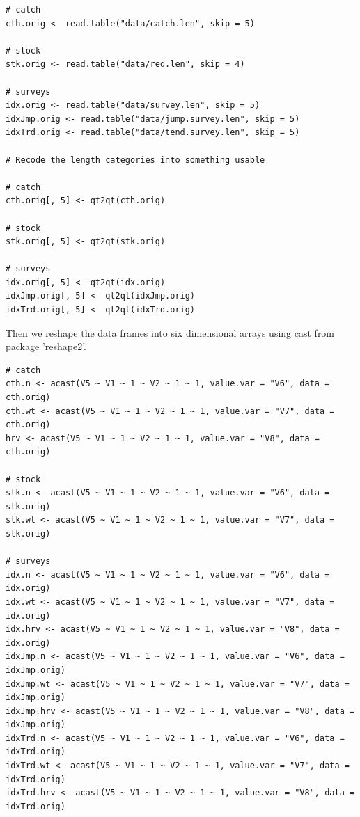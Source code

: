 \documentclass[a4paper,english,10pt]{article}\usepackage[]{graphicx}\usepackage[]{color}
\makeatletter
\newenvironment{kframe}{%
 \def\at@end@of@kframe{}%
 \ifinner\ifhmode%
  \def\at@end@of@kframe{\end{minipage}}%
  \begin{minipage}{\columnwidth}%
 \fi\fi%
 \def\FrameCommand##1{\hskip\@totalleftmargin \hskip-\fboxsep
 \colorbox{shadecolor}{##1}\hskip-\fboxsep
     \hskip-\linewidth \hskip-\@totalleftmargin \hskip\columnwidth}%
 \MakeFramed {\advance\hsize-\width
   \@totalleftmargin\z@ \linewidth\hsize
   \@setminipage}}%
 {\par\unskip\endMakeFramed%
 \at@end@of@kframe}
\newenvironment{knitrout}{}{} %
\makeatother
\begin{document}
\begin{knitrout}
\color{fgcolor}\begin{kframe}
\begin{verbatim}
# catch
cth.orig <- read.table("data/catch.len", skip = 5)

# stock
stk.orig <- read.table("data/red.len", skip = 4)

# surveys
idx.orig <- read.table("data/survey.len", skip = 5)
idxJmp.orig <- read.table("data/jump.survey.len", skip = 5)
idxTrd.orig <- read.table("data/tend.survey.len", skip = 5)

# Recode the length categories into something usable

# catch
cth.orig[, 5] <- qt2qt(cth.orig)

# stock
stk.orig[, 5] <- qt2qt(stk.orig)

# surveys
idx.orig[, 5] <- qt2qt(idx.orig)
idxJmp.orig[, 5] <- qt2qt(idxJmp.orig)
idxTrd.orig[, 5] <- qt2qt(idxTrd.orig)
\end{verbatim}
\end{kframe}
\end{knitrout}


Then we reshape the data frames into six dimensional arrays using cast from package 'reshape2'.

\begin{knitrout}
\color{fgcolor}\begin{kframe}
\begin{verbatim}
# catch
cth.n <- acast(V5 ~ V1 ~ 1 ~ V2 ~ 1 ~ 1, value.var = "V6", data = cth.orig)
cth.wt <- acast(V5 ~ V1 ~ 1 ~ V2 ~ 1 ~ 1, value.var = "V7", data = cth.orig)
hrv <- acast(V5 ~ V1 ~ 1 ~ V2 ~ 1 ~ 1, value.var = "V8", data = cth.orig)

# stock
stk.n <- acast(V5 ~ V1 ~ 1 ~ V2 ~ 1 ~ 1, value.var = "V6", data = stk.orig)
stk.wt <- acast(V5 ~ V1 ~ 1 ~ V2 ~ 1 ~ 1, value.var = "V7", data = stk.orig)

# surveys
idx.n <- acast(V5 ~ V1 ~ 1 ~ V2 ~ 1 ~ 1, value.var = "V6", data = idx.orig)
idx.wt <- acast(V5 ~ V1 ~ 1 ~ V2 ~ 1 ~ 1, value.var = "V7", data = idx.orig)
idx.hrv <- acast(V5 ~ V1 ~ 1 ~ V2 ~ 1 ~ 1, value.var = "V8", data = idx.orig)
idxJmp.n <- acast(V5 ~ V1 ~ 1 ~ V2 ~ 1 ~ 1, value.var = "V6", data = idxJmp.orig)
idxJmp.wt <- acast(V5 ~ V1 ~ 1 ~ V2 ~ 1 ~ 1, value.var = "V7", data = idxJmp.orig)
idxJmp.hrv <- acast(V5 ~ V1 ~ 1 ~ V2 ~ 1 ~ 1, value.var = "V8", data = idxJmp.orig)
idxTrd.n <- acast(V5 ~ V1 ~ 1 ~ V2 ~ 1 ~ 1, value.var = "V6", data = idxTrd.orig)
idxTrd.wt <- acast(V5 ~ V1 ~ 1 ~ V2 ~ 1 ~ 1, value.var = "V7", data = idxTrd.orig)
idxTrd.hrv <- acast(V5 ~ V1 ~ 1 ~ V2 ~ 1 ~ 1, value.var = "V8", data = idxTrd.orig)
\end{verbatim}
\end{kframe}
\end{knitrout}
\end{document}
